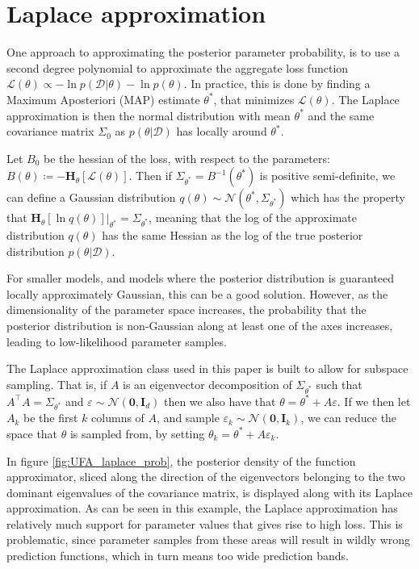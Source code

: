 \section{Laplace approximation}
One approach to approximating the posterior parameter probability, is to use a second degree polynomial to approximate the aggregate loss function $\mathcal L(\theta)\propto - \ln p(\mathcal{D} \vert\theta) - \ln p(\theta)$. In practice, this is done by finding a Maximum Aposteriori (MAP) estimate $\theta^\ast$, that  minimizes $\mathcal L(\theta)$. The Laplace approximation is then the normal distribution with mean $\theta^\ast$ and the same covariance matrix $\Sigma_0$ as $p(\theta \vert \mathcal D)$ has locally around $ \theta^\ast$.

Let $B_0$ be the hessian of the loss, with respect to the parameters:
$B(\theta) \coloneq - \mathbf{H}_{\theta}[\mathcal{L(\theta)}].$
Then if $\Sigma_{\theta^\ast} = B^{-1}(\theta^\ast)$ is positive semi-definite, we can define a Gaussian distribution $q(\theta) \sim \mathcal N( \theta^\ast, \Sigma_{\theta^\ast})$ which has the property that $\left. \mathbf{H}_{\theta}[\ln q(\theta)]\right\vert_{\theta^\ast} =\Sigma_{\theta^\ast}$, meaning that the log of the approximate distribution $q(\theta)$ has the same Hessian as the log of the true posterior distribution $p(\theta\vert\mathcal{D})$.

For smaller models, and models where the posterior distribution is guaranteed locally approximately Gaussian, this can be a good solution. However, as the dimensionality of the parameter space increases, the probability that the posterior distribution is non-Gaussian along at least one of the axes increases, leading to low-likelihood parameter samples.

The Laplace approximation class used in this paper is built to allow for subspace sampling. That is, if $A$ is an eigenvector decomposition of $\Sigma_{\theta^\ast}$ such that $A^\top A = \Sigma_{\theta^\ast}$ and $\varepsilon \sim \mathcal N(\bm 0,\bm I_d)$ then we also have that $\theta = \theta^\ast +A \varepsilon$. 
If we then let $A_k$ be the first $k$ columns of $A$, and sample $\varepsilon_k \sim \mathcal N(\bm 0,\bm I_k)$, we can reduce the space that $\theta$ is sampled from, by setting $\theta_k = \theta^\ast +A \varepsilon_k$. 

In figure \ref{fig:UFA_laplace_prob}, the posterior density of the function approximator, sliced along the direction of the eigenvectors belonging to the two dominant eigenvalues of the covariance matrix, is displayed along with its Laplace approximation. As can be seen in this example, the Laplace approximation has relatively much support for parameter values that gives rise to high loss. This is problematic, since parameter samples from these areas will result in wildly wrong prediction functions, which in turn means too wide prediction bands.

